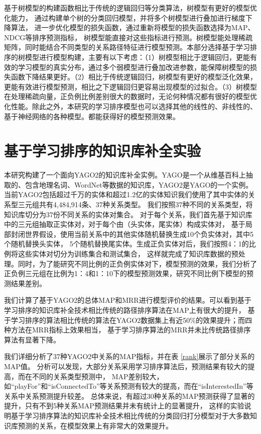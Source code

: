 基于树模型的构建函数相比于传统的逻辑回归等分类算法，树模型有更好的模型优化能力，
通过构建单个树的分类回归模型，并将多个树模型进行叠加进行梯度下降算法，
进一步优化模型的损失函数，通过重新将模型的损失函数选择为MAP、NDCG等排序预测指标，
树模型能直接对这些指标进行预测。树模型能处理稀疏矩阵，同时能结合不同类型的关系路径特征进行模型预测。本部分选择基于学习排序的树模型进行模型构建，主要有以下考虑：（1）树模型相比于逻辑回归，更能有效的学习模型的真实分布，通过多个弱模型进行叠加改进参数，能保障树模型的损失函数下降结果更好。（2）相比于传统逻辑回归，树模型有更好的模型泛化效果，更能有效进行模型预测，相比之下逻辑回归更容易出现模型的过拟合。（3）树模型在处理稀疏向量，正负例比例差别很大的数据时，无论何种情况都有很好的模型优化性能。除此之外，本研究的学习排序模型也可以选择其他的线性的、非线性的、基于神经网络的各种模型。都能获得好的模型预测效果。

\section{基于学习排序的知识库补全实验}
\label{cha:exp-relational}

本研究构建了一个面向YAGO2的知识库补全实例。YAGO是一个从维基百科上抽取的、包含地理名词、WordNet等数据的知识库，YAGO2是YAGO的一个实例。
当前YAGO2包括超过千万的实体和超过1.2亿的实体知识我们使用了其中实体的关系型三元组共有4,484,914条、37种关系类型。
我们按照37种不同的关系类型，将知识库切分为37份不同关系的实体对集合。
对于每个关系，我们首先基于知识库中的三元组抽取正实体对，对于每个由（头实体，尾实体）构成实体对，
基于局部封闭世界假设，使用当前关系中的其他实体随机替换生成10个负实体对，其中5个随机替换头实体，
5个随机替换尾实体。生成正负实体对后，我们按照4：1的比例将这些实体对切分为训练集合和测试集合，
这样就完成了知识库数据的预处理。同时，为了能研究不同比例的正负例实体对下，模型预测的效果，我们分析了正负例三元组在比例为1：4和1：10下的模型预测效果，研究不同比例下模型的预测结果差别。

我们计算了基于YAGO2的总体MAP和MRR进行模型评价的结果。可以看到基于学习排序的知识库补全技术相比传统的路径排序算法在MAP上有很大的提升，
基于学习排序的算法相比传统的算法在YAGO2数据集上有近50\%的效果提升；而四种方法在MRR指标上效果相当，
基于学习排序算法的MRR并未比传统路径排序算法有显著下降。

我们详细分析了37种YAGO2中关系的MAP指标，并在表 \ref{rank}展示了部分关系的MAP值。
分析可以发现，大部分关系采用学习排序算法后，预测结果有较大的提高，而在不同的关系类型预测中，
MAP差别较大，如“playFor”和“isConnectedTo”等关系预测有较大的提高，而在“isInterestedIn”等关系中关系预测提升较差。
总体来说，有超过30种关系的MAP预测获得了显著的提升，只有不到5种关系MAP预测结果并未有统计上的显著提升，
这样的实验说明基于学习排序算法的知识库补全技术相比传统的分类回归打分模型对于大多数知识库预测的关系，在模型效果上有非常大的效果提升。

